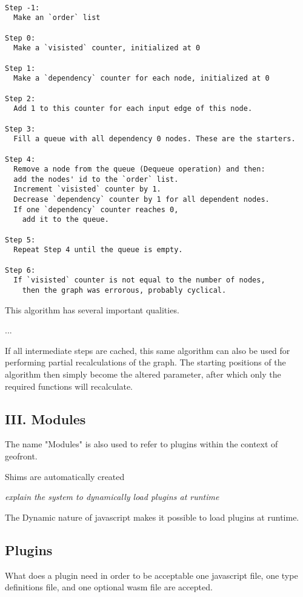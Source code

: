 \begin{lstlisting}

Step -1: 
  Make an `order` list

Step 0: 
  Make a `visisted` counter, initialized at 0

Step 1: 
  Make a `dependency` counter for each node, initialized at 0

Step 2: 
  Add 1 to this counter for each input edge of this node.

Step 3: 
  Fill a queue with all dependency 0 nodes. These are the starters.

Step 4: 
  Remove a node from the queue (Dequeue operation) and then:
  add the nodes' id to the `order` list.
  Increment `visisted` counter by 1.
  Decrease `dependency` counter by 1 for all dependent nodes.
  If one `dependency` counter reaches 0, 
    add it to the queue.

Step 5: 
  Repeat Step 4 until the queue is empty.

Step 6: 
  If `visisted` counter is not equal to the number of nodes, 
    then the graph was errorous, probably cyclical. 

\end{lstlisting}

This algorithm has several important qualities. 

...

If all intermediate steps are cached, this same algorithm can also be used for performing partial recalculations of the graph. 
The starting positions of the algorithm then simply become the altered parameter, after which only the required functions will recalculate. 


\subsection*{III. Modules} 


The name "Modules" is also used to refer to plugins within the context of geofront.

Shims are automatically created

\emph{explain the system to dynamically load plugins at runtime}

The Dynamic nature of javascript makes it possible to load plugins at runtime. 

  

\subsection{Plugins}
What does a plugin need in order to be acceptable
one javascript file, one type definitions file, and one optional wasm file are accepted. 

